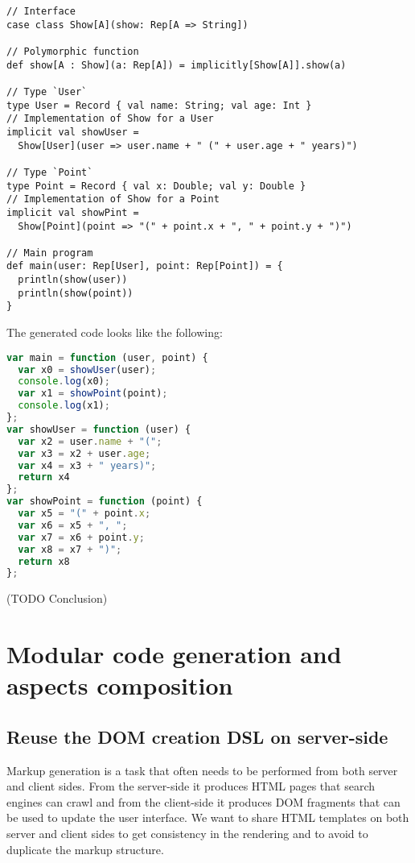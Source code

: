 \documentclass[american,english,runningheads]{llncs}
\begin{document}
\begin{lstlisting}
// Interface
case class Show[A](show: Rep[A => String])

// Polymorphic function
def show[A : Show](a: Rep[A]) = implicitly[Show[A]].show(a)

// Type `User`
type User = Record { val name: String; val age: Int }
// Implementation of Show for a User
implicit val showUser =
  Show[User](user => user.name + " (" + user.age + " years)")

// Type `Point`
type Point = Record { val x: Double; val y: Double }
// Implementation of Show for a Point
implicit val showPint =
  Show[Point](point => "(" + point.x + ", " + point.y + ")")

// Main program
def main(user: Rep[User], point: Rep[Point]) = {
  println(show(user))
  println(show(point))
}
\end{lstlisting}
The generated code looks like the following:
\begin{lstlisting}[language=JavaScript]
var main = function (user, point) {
  var x0 = showUser(user);
  console.log(x0);
  var x1 = showPoint(point);
  console.log(x1);
};
var showUser = function (user) {
  var x2 = user.name + "(";
  var x3 = x2 + user.age;
  var x4 = x3 + " years)";
  return x4
};
var showPoint = function (point) {
  var x5 = "(" + point.x;
  var x6 = x5 + ", ";
  var x7 = x6 + point.y;
  var x8 = x7 + ")";
  return x8
};
\end{lstlisting}

(TODO Conclusion)

\section{Modular code generation and aspects composition}
\label{lms-benefits}

\subsection{Reuse the DOM creation DSL on server-side}

Markup generation is a task that often needs to be performed from both server and client sides. From the server-side it produces HTML pages that search engines can crawl and from the client-side it produces DOM fragments that can be used to update the user interface. We want to share HTML templates on both server and client sides to get consistency in the rendering and to avoid to duplicate the markup structure.
\end{document}
